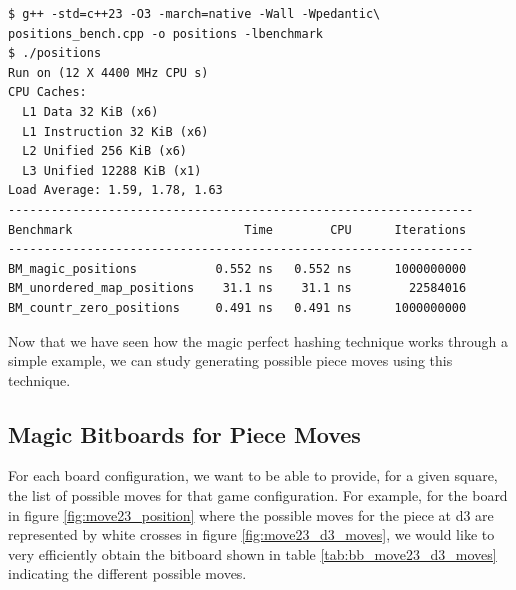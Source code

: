 \documentclass[12pt,a4paper,twoside,openright]{book}
\begin{document}
\begin{mdframed}[skipabove=\baselineskip,skipbelow=0pt,hidealllines=true,backgroundcolor=black!3,innerleftmargin=10pt,innerrightmargin=5pt,innertopmargin=0pt,innerbottommargin=5pt]
\begin{verbatim}
$ g++ -std=c++23 -O3 -march=native -Wall -Wpedantic\
positions_bench.cpp -o positions -lbenchmark
$ ./positions
Run on (12 X 4400 MHz CPU s)
CPU Caches:
  L1 Data 32 KiB (x6)
  L1 Instruction 32 KiB (x6)
  L2 Unified 256 KiB (x6)
  L3 Unified 12288 KiB (x1)
Load Average: 1.59, 1.78, 1.63
-----------------------------------------------------------------
Benchmark                        Time        CPU      Iterations
-----------------------------------------------------------------
BM_magic_positions           0.552 ns   0.552 ns      1000000000
BM_unordered_map_positions    31.1 ns    31.1 ns        22584016
BM_countr_zero_positions     0.491 ns   0.491 ns      1000000000
\end{verbatim}
\end{mdframed}
\begin{mdframed}[skipabove=0pt,skipbelow=\baselineskip,hidealllines=true,innerleftmargin=10pt,innerrightmargin=5pt,innertopmargin=3pt,innerbottommargin=3pt]
\label{lst:result_compare_hashmap_magic}
\end{mdframed}

Now that we have seen how the magic perfect hashing technique works through a simple example, we can study generating possible piece moves using this technique.

\subsection{Magic Bitboards for Piece Moves}

For each board configuration, we want to be able to provide, for a given square, the list of possible moves for that game configuration. For example, for the board in figure \ref{fig:move23_position} where the possible moves for the piece at {\ttfamily d3} are represented by white crosses in figure \ref{fig:move23_d3_moves}, we would like to very efficiently obtain the bitboard shown in table \ref{tab:bb_move23_d3_moves} indicating the different possible moves.\\
\end{document}
